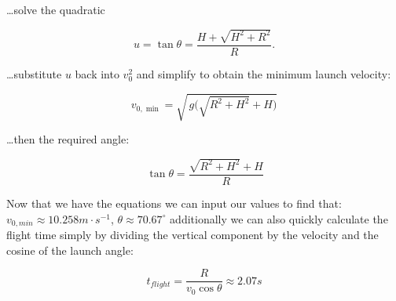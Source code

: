 \documentclass[a4paper,10pt]{article} %
\begin{document}
\ldots solve the quadratic

\begin{equation*}
u=\tan\theta
= \frac{H+\sqrt{H^{2}+R^{2}}}{R}.
\end{equation*}

\ldots substitute \(u\) back into \(v_0^{2}\) and simplify to obtain the minimum launch velocity:

\begin{equation}
\boxed{\,v_{0,\min}=\sqrt{\,g\big(\sqrt{R^{2}+H^{2}}+H\big)}\,}
\end{equation}

\ldots then the required angle:

\begin{equation}
\boxed{\,\tan\theta=\dfrac{\sqrt{R^{2}+H^{2}}+H}{R}}
\end{equation}

Now that we have the equations we can input our values to find that: $v_{0,min} \approx 10.258 m\cdot s^{-1}$, $\theta \approx 70.67 ^\circ$ additionally we can also quickly calculate the flight time simply by dividing the vertical component by the velocity and the cosine of the launch angle:

\begin{equation}
    t_{flight} = \frac{R}{v_0 \cos\theta} \approx 2.07s
\end{equation}

\newpage
\end{document}
